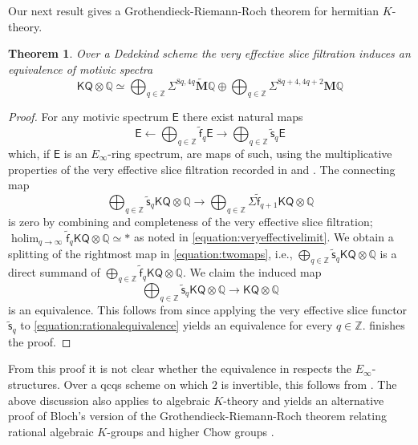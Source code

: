 \documentclass[11pt,hyp,english]{article}
\newcommand{\E}{\mathsf{E}}
\newcommand{\Z}{\mathbb{Z}}
\newcommand{\Q}{\mathbb{Q}}
\newcommand{\KQ}{\mathsf{KQ}}
\newcommand{\HQ}{\mathbf{M}\Q}
\newcommand{\cHQ}{{\wt{\mathbf{M}}}{\Q}}
\newcommand{\holim}{\operatorname{holim}}
\newcommand{\tensor}{\otimes}
\newcommand{\wt}[1]{\widetilde{#1}}
\newcommand{\vs}{\tilde{\mathsf{s}}}
\newcommand{\vf}{\tilde{{\mathsf{f}}}}
\newtheorem{theorem}{Theorem}[section]
\theoremstyle{definition}
\begin{document}
Our next result gives a Grothendieck-Riemann-Roch theorem for hermitian $K$-theory.

\begin{theorem}
\label{theorem:eoosplitting}
Over a Dedekind scheme the very effective slice filtration induces an equivalence of motivic spectra
$$
\KQ\tensor\Q
\simeq
\bigoplus_{q\in \Z}\Sigma^{8q,4q}\cHQ \oplus  \bigoplus_{q\in \Z}\Sigma^{8q+4,4q+2}\HQ
$$
\end{theorem}
\begin{proof}
For any motivic spectrum $\E$ there exist natural maps 
\begin{equation}
\label{equation:twomaps}
\E \leftarrow  \bigoplus_{q\in \Z} \vf_q\E \to \bigoplus_{q\in \Z} \vs_q \E 
\end{equation}
which, if $\E$ is an $E_\infty$-ring spectrum, are maps of such, using the multiplicative properties of the very effective slice filtration recorded in 
\cite[Sections 5,6]{grso} and \cite[Theorems 3.8, 3.14]{grso-2}.
The connecting map 
\[ \bigoplus_{q\in \Z}\vs_q\KQ\tensor \Q\to \bigoplus_{q\in \Z}\Sigma \vf_{q+1}\KQ\tensor \Q\]
is zero by combining  and 
completeness of the very effective slice filtration; 
$\holim_{q\to\infty}\vf_{q}\KQ\tensor \Q \simeq\ast$ as noted in \eqref{equation:veryeffectivelimit}.
We obtain a splitting of the rightmost map in \eqref{equation:twomaps}, 
i.e., 
$\bigoplus_{q\in \Z} \vs_q \KQ\tensor \Q$ is a direct summand of 
$\bigoplus_{q\in \Z} \vf_q \KQ\tensor \Q$.
We claim the induced map 
\begin{equation}
\label{equation:rationalequivalence}
\bigoplus_{q\in \Z} \vs_q \KQ\tensor \Q\to \KQ\tensor \Q
\end{equation}
is an equivalence. 
This follows from  since applying the very effective 
slice functor $\vs_q$ to \eqref{equation:rationalequivalence} yields an equivalence for 
every $q\in\Z$.
 finishes the proof.
\end{proof}

From this proof it is not clear whether the equivalence in  respects the $E_\infty$-structures.
Over a qcqs scheme on which $2$ is invertible, this follows from \cite{deglise-fasel.borel}.
The above discussion also applies to algebraic $K$-theory and yields an alternative proof of Bloch's version 
of the Grothendieck-Riemann-Roch theorem relating rational algebraic $K$-groups and higher Chow groups 
\cite{zbMATH03983347}.
\end{document}
